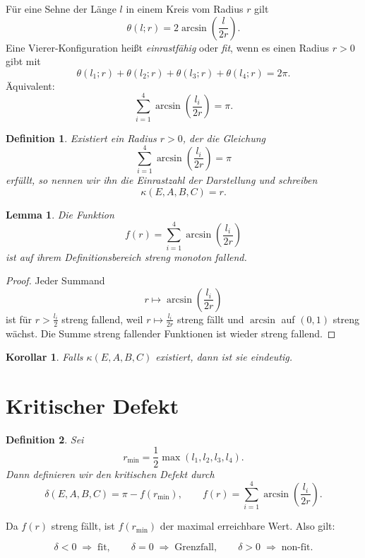 \documentclass[11pt,a4paper]{article}
\newtheorem{definition}{Definition}
\newtheorem{lemma}{Lemma}
\newtheorem{korollar}{Korollar}
\theoremstyle{remark}
\begin{document}
	Für eine Sehne der Länge \(l\) in einem Kreis vom Radius \(r\) gilt
	\[
	\theta(l;r)=2\arcsin\!\left(\frac{l}{2r}\right).
	\]
	Eine Vierer-Konfiguration heißt \emph{einrastfähig} oder \emph{fit}, wenn es einen Radius \(r>0\) gibt mit
	\[
	\theta(l_1;r)+\theta(l_2;r)+\theta(l_3;r)+\theta(l_4;r)=2\pi.
	\]
	Äquivalent:
	\[
	\sum_{i=1}^4 \arcsin\!\left(\frac{l_i}{2r}\right)=\pi.
	\]
	
	\begin{definition}
		Existiert ein Radius \(r>0\), der die Gleichung
		\[
		\sum_{i=1}^4 \arcsin\!\left(\frac{l_i}{2r}\right)=\pi
		\]
		erfüllt, so nennen wir ihn die \emph{Einrastzahl} der Darstellung und schreiben
		\[
		\kappa(E,A,B,C)=r.
		\]
	\end{definition}
	
	\begin{lemma}
		Die Funktion
		\[
		f(r)=\sum_{i=1}^4 \arcsin\!\left(\frac{l_i}{2r}\right)
		\]
		ist auf ihrem Definitionsbereich streng monoton fallend.
	\end{lemma}
	
	\begin{proof}
		Jeder Summand
		\[
		r\mapsto \arcsin\!\left(\frac{l_i}{2r}\right)
		\]
		ist für \(r>\frac{l_i}{2}\) streng fallend, weil \(r\mapsto \frac{l_i}{2r}\) streng fällt und \(\arcsin\) auf \((0,1)\) streng wächst. Die Summe streng fallender Funktionen ist wieder streng fallend.
	\end{proof}
	
	\begin{korollar}
		Falls \(\kappa(E,A,B,C)\) existiert, dann ist sie eindeutig.
	\end{korollar}
	
	\section{Kritischer Defekt}
	
	\begin{definition}
		Sei
		\[
		r_{\min}=\frac12\max(l_1,l_2,l_3,l_4).
		\]
		Dann definieren wir den \emph{kritischen Defekt} durch
		\[
		\delta(E,A,B,C)=\pi-f(r_{\min}),
		\qquad
		f(r)=\sum_{i=1}^4 \arcsin\!\left(\frac{l_i}{2r}\right).
		\]
	\end{definition}
	
	Da \(f(r)\) streng fällt, ist \(f(r_{\min})\) der maximal erreichbare Wert. Also gilt:
	
	\[
	\delta<0 \;\Longrightarrow\; \text{fit},
	\qquad
	\delta=0 \;\Longrightarrow\; \text{Grenzfall},
	\qquad
	\delta>0 \;\Longrightarrow\; \text{non-fit}.
	\]
	
\end{document}
